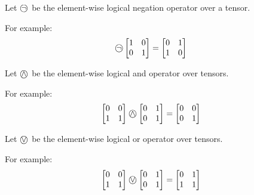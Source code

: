 \begin{definition}
	Let $\incircbin{\neg}$ be the element-wise logical negation operator over a tensor.
	
	For example:
	\begin{align*}
		\incircbin{\neg}
		\begin{bmatrix}
		1&0\\
		0&1\\
		\end{bmatrix}&=
		\begin{bmatrix}
			0&1\\
			1&0\\
		\end{bmatrix}
	\end{align*}
\end{definition}

\begin{definition}
	Let $\incircbin{\land}$ be the element-wise logical and operator over tensors.
	
	For example:
	\begin{align*}
	\begin{bmatrix}
	0&0\\
	1&1\\
	\end{bmatrix}
	\incircbin{\land}
	\begin{bmatrix}
	0&1\\
	0&1\\
	\end{bmatrix}
	&=
	\begin{bmatrix}
	0&0\\
	0&1\\
	\end{bmatrix}
	\end{align*}
\end{definition}

\begin{definition}
	Let $\incircbin{\lor}$ be the element-wise logical or operator over tensors.
	
	For example:
	\begin{align*}
	\begin{bmatrix}
	0&0\\
	1&1\\
	\end{bmatrix}
	\incircbin{\lor}
	\begin{bmatrix}
	0&1\\
	0&1\\
	\end{bmatrix}
	&=
	\begin{bmatrix}
	0&1\\
	1&1\\
	\end{bmatrix}
	\end{align*}
\end{definition}

